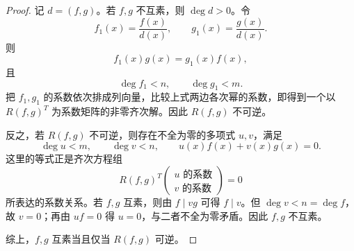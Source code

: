 \begin{proof}
	记 $d=(f,g)$。若 $f,g$ 不互素，则 $\deg d>0$。令
	\[
	f_1(x)=\frac{f(x)}{d(x)},
	\qquad
	g_1(x)=\frac{g(x)}{d(x)}.
	\]
	则
	\[
	f_1(x)g(x)=g_1(x)f(x),
	\]
	且
	\[
	\deg f_1<n,
	\qquad
	\deg g_1<m.
	\]
	把 $f_1,g_1$ 的系数依次排成列向量，比较上式两边各次幂的系数，即得到一个以 $R(f,g)^T$ 为系数矩阵的非零齐次解。因此 $R(f,g)$ 不可逆。
	
	反之，若 $R(f,g)$ 不可逆，则存在不全为零的多项式 $u,v$，满足
	\[
	\deg u<m,
	\qquad
	\deg v<n,
	\qquad
	u(x)f(x)+v(x)g(x)=0.
	\]
	这里的等式正是齐次方程组
	\[
	R(f,g)^T
	\begin{pmatrix}
		\text{$u$ 的系数}\\
		\text{$v$ 的系数}
	\end{pmatrix}=0
	\]
	所表达的系数关系。若 $f,g$ 互素，则由 $f\mid vg$ 可得 $f\mid v$。但 $\deg v<n=\deg f$，故 $v=0$；再由 $uf=0$ 得 $u=0$，与二者不全为零矛盾。因此 $f,g$ 不互素。
	
	综上，$f,g$ 互素当且仅当 $R(f,g)$ 可逆。
\end{proof}

